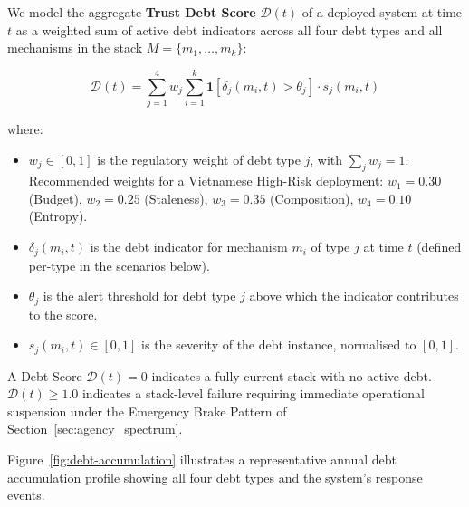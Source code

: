 We model the aggregate \textbf{Trust Debt Score} $\mathcal{D}(t)$
of a deployed system at time $t$ as a weighted sum of
active debt indicators across all four debt types and all
mechanisms in the stack $M = \{m_1, \ldots, m_k\}$:

\begin{equation}
  \label{eq:debt-score}
  \mathcal{D}(t)
    = \sum_{j=1}^{4} w_j
      \sum_{i=1}^{k}
        \mathbf{1}\!\left[
          \delta_{j}(m_i, t) > \theta_j
        \right]
      \cdot s_{j}(m_i, t)
\end{equation}

where:
\begin{itemize}
  \item $w_j \in [0,1]$ is the regulatory weight of debt
    type $j$, with $\sum_j w_j = 1$.
    Recommended weights for a Vietnamese High-Risk deployment:
    $w_1 = 0.30$ (Budget),
    $w_2 = 0.25$ (Staleness),
    $w_3 = 0.35$ (Composition),
    $w_4 = 0.10$ (Entropy).

  \item $\delta_{j}(m_i, t)$ is the debt indicator for
    mechanism $m_i$ of type $j$ at time $t$
    (defined per-type in the scenarios below).

  \item $\theta_j$ is the alert threshold for debt type $j$
    above which the indicator contributes to the score.

  \item $s_{j}(m_i, t) \in [0, 1]$ is the severity of the
    debt instance, normalised to $[0,1]$.
\end{itemize}

A Debt Score $\mathcal{D}(t) = 0$ indicates a fully current
stack with no active debt.
$\mathcal{D}(t) \geq 1.0$ indicates a stack-level failure
requiring immediate operational suspension under the Emergency
Brake Pattern of Section~\ref{sec:agency_spectrum}.

Figure~\ref{fig:debt-accumulation} illustrates a representative
annual debt accumulation profile showing all four debt types
and the system's response events.

